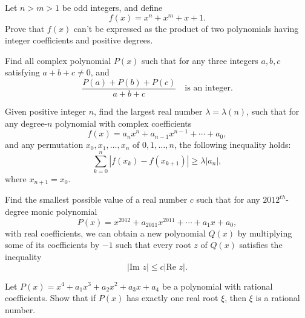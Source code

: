 \documentclass[12pt,a4paper]{memoir}
\theoremstyle{definition}
\begin{document}
\begin{question}[name={2008 China TST}]
	Let $n>m>1$ be odd integers, and define \[f(x)=x^n+x^m+x+1.\] Prove that $f(x)$ can't be expressed as the product of two polynomials having integer coefficients and positive degrees.
\end{question}



\begin{question}[name={2009 China TST}]
	Find all complex polynomial $P(x)$ such that for any three integers $a,b,c$ satisfying $ a + b + c\not = 0$, and \[\displaystyle \frac{P(a) + P(b) + P(c)}{a + b + c} \quad \text{is an integer.}\]
\end{question}


\begin{question}[name={2010 China TST}]
	Given positive integer $n$, find the largest real number $\lambda=\lambda(n)$, such that for any degree-$n$ polynomial with complex coefficients \[f(x)=a_n x^n+a_{n-1} x^{n-1}+\cdots+a_0,\] and any permutation $x_0,x_1,\dots,x_n$ of $0,1,\dots,n$, the following inequality holds: \[\sum_{k=0}^n|f(x_k)-f(x_{k+1})|\geq \lambda |a_n|,\] where $x_{n+1}=x_0$.
\end{question}


\begin{question}[name={2012 China TST}]
	Find the smallest possible value of a real number $c$ such that for any $2012^{th}$-degree monic polynomial
	\[P(x)=x^{2012}+a_{2011}x^{2011}+\cdots+a_1x+a_0,\] with real coefficients, we can obtain a new polynomial $Q(x)$ by multiplying some of its coefficients by $-1$ such that every root $z$ of $Q(x)$ satisfies the inequality
	\[ \left\lvert \text{Im } z \right\rvert \le c \left\lvert \text{Re } z \right\rvert. \]
\end{question}



\begin{question}[name={1981 Austrian--Polish}]
	Let $P(x) = x^4 + a_1x^3 + a_2x^2 + a_3x + a_4$ be a polynomial with rational coefficients. Show that if $P(x)$ has exactly one real root $\xi$, then $\xi$ is a rational number.
\end{question}
\end{document}
